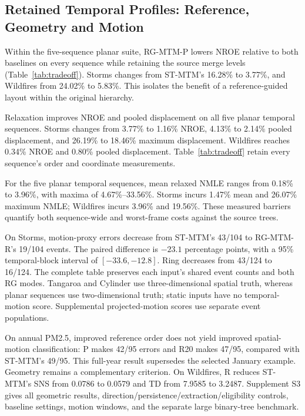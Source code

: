 \subsection{Retained Temporal Profiles: Reference, Geometry and Motion}
Within the five-sequence planar suite, RG-MTM-P lowers NROE relative to both baselines on every sequence while retaining the source merge levels (Table~\ref{tab:tradeoff}). Storms changes from ST-MTM's 16.28\% to 3.77\%, and Wildfires from 24.02\% to 5.83\%. This isolates the benefit of a reference-guided layout within the original hierarchy.

Relaxation improves NROE and pooled displacement on all five planar temporal sequences. Storms changes from 3.77\% to 1.16\% NROE, 4.13\% to 2.14\% pooled displacement, and 26.19\% to 18.46\% maximum displacement. Wildfires reaches 0.34\% NROE and 0.80\% pooled displacement. Table~\ref{tab:tradeoff} retain every sequence's order and coordinate measurements.

For the five planar temporal sequences, mean relaxed NMLE ranges from 0.18\% to 3.96\%, with maxima of 4.67\%--33.56\%. Storms incurs 1.47\% mean and 26.07\% maximum NMLE; Wildfires incurs 3.96\% and 19.56\%. These measured barriers quantify both sequence-wide and worst-frame costs against the source trees.


On Storms, motion-proxy errors decrease from ST-MTM's 43/104 to RG-MTM-R's 19/104 events. The paired difference is $-23.1$ percentage points, with a 95\% temporal-block interval of $[-33.6,-12.8]$. Ring decreases from 43/124 to 16/124. The complete table preserves each input's shared event counts and both RG modes. Tangaroa and Cylinder use three-dimensional spatial truth, whereas planar sequences use two-dimensional truth; static inputs have no temporal-motion score. Supplemental projected-motion scores use separate event populations.

On annual PM2.5, improved reference order does not yield improved spatial-motion classification: P makes 42/95 errors and R20 makes 47/95, compared with ST-MTM's 49/95. This full-year result supersedes the selected January example. Geometry remains a complementary criterion. On Wildfires, R reduces ST-MTM's SNS from 0.0786 to 0.0579 and TD from 7.9585 to 3.2487. Supplement S3 gives all geometric results, direction/persistence/extraction/eligibility controls, baseline settings, motion windows, and the separate large binary-tree benchmark.

